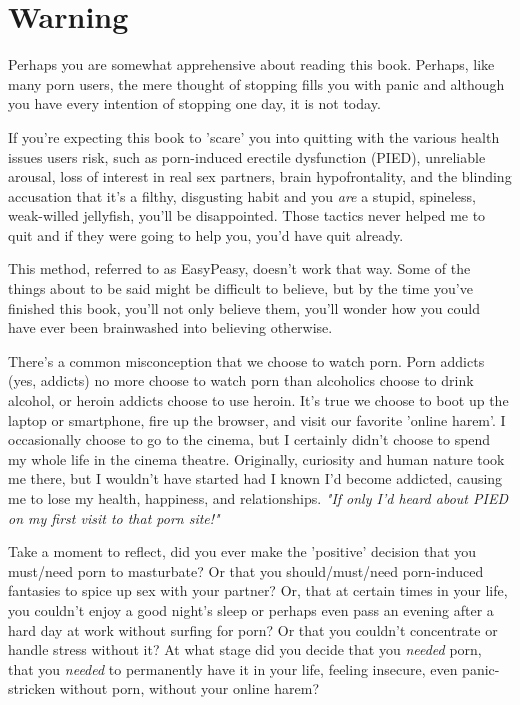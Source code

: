 \documentclass[easypeasy.tex]{subfiles}
\begin{document}
\section{Warning}
 Perhaps you are somewhat apprehensive about reading this book. Perhaps, like many porn users, the mere thought of stopping fills you with panic and although you have every intention of stopping one day, it is not today.

If you're expecting this book to 'scare' you into quitting with the various health issues users risk, such as porn-induced erectile dysfunction (PIED), unreliable arousal, loss of interest in real sex partners, brain hypofrontality, and the blinding accusation that it's a filthy, disgusting habit and you \textit{are} a stupid, spineless, weak-willed jellyfish, you'll be disappointed. Those tactics never helped me to quit and if they were going to help you, you'd have quit already.

This method, referred to as EasyPeasy, doesn't work that way. Some of the things about to be said might be difficult to believe, but by the time you've finished this book, you'll not only believe them, you'll wonder how you could have ever been brainwashed into believing otherwise.

There's a common misconception that we choose to watch porn. Porn addicts (yes, addicts) no more choose to watch porn than alcoholics choose to drink alcohol, or heroin addicts choose to use heroin. It's true we choose to boot up the laptop or smartphone, fire up the browser, and visit our favorite 'online harem'. I occasionally choose to go to the cinema, but I certainly didn't choose to spend my whole life in the cinema theatre. Originally, curiosity and human nature took me there, but I wouldn't have started had I known I'd become addicted, causing me to lose my health, happiness, and relationships.
\textit{"If only I'd heard about PIED on my first visit to that porn site!"}

Take a moment to reflect, did you ever make the 'positive' decision that you must/need porn to masturbate? Or that you should/must/need porn-induced fantasies to spice up sex with your partner? Or, that at certain times in your life, you couldn't enjoy a good night's sleep or perhaps even pass an evening after a hard day at work without surfing for porn? Or that you couldn't concentrate or handle stress without it? At what stage did you decide that you \textit{needed} porn, that you \textit{needed} to permanently have it in your life, feeling insecure, even panic-stricken without porn, without your online harem?
\end{document}
